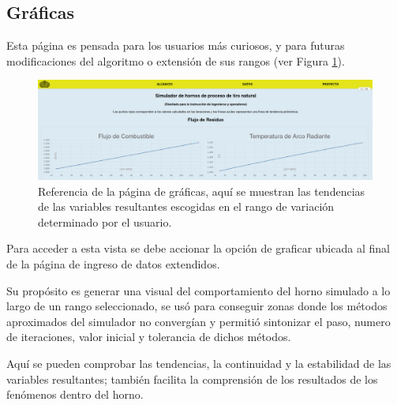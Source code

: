 \subsection{Gráficas}
\par Esta página es pensada para los usuarios más curiosos, y para futuras modificaciones del algoritmo o extensión de sus rangos (ver Figura \ref{fig:graficas}).
\begin{figure}[H]\begin{center}
\includegraphics[scale=0.23]{images/graficas.png}
\caption[Página de gráficas]{Referencia de la página de gráficas, aquí se muestran las tendencias de las variables resultantes escogidas en el rango de variación determinado por el usuario.}
\label{fig:graficas} \end{center} \end{figure}
\par Para acceder a esta vista se debe accionar la opción de graficar ubicada al final de la página de ingreso de datos extendidos.
\par Su propósito es generar una visual del comportamiento del horno simulado a lo largo de un rango seleccionado, se usó para conseguir zonas donde los métodos aproximados del simulador no convergían y permitió sintonizar el paso, numero de iteraciones, valor inicial y tolerancia de dichos métodos.
\par Aquí se pueden comprobar las tendencias, la continuidad y la estabilidad de las variables resultantes; también facilita la comprensión de los resultados de los fenómenos dentro del horno.


